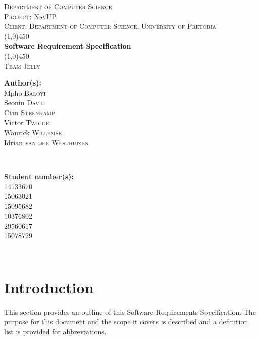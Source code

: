 \documentclass[a4paper,12pt]{article}
\begin{document}
\begin{titlepage}
\center


\textsc{\LARGE Department of Computer Science} \\ [.5cm]
\textsc{\Large Project: NavUP} \\ [.5cm]
\textsc{\Large Client: Department of Computer Science, University of Pretoria} \\ [.5cm]
\line(1,0){450}\\[.5cm]
\huge{\bfseries Software Requirement Specification}\\
\line(1,0){450}\\[.5cm]
\textsc{\LARGE Team Jelly}\\ [0.5cm]

\begin{minipage}{0.4\textwidth}
\begin{flushleft} \large
\textbf{Author(s):}\\
Mpho \textsc{Baloyi}\\
Seonin  \textsc{David}\\
Cian  \textsc{Steenkamp}\\
Victor \textsc{Twigge}\\
Wanrick  \textsc{Willemse}\\
Idrian  \textsc{van der Westhuizen}\\
\end{flushleft}
\end{minipage}
~
\begin{minipage}{0.4\textwidth}
\begin{flushright} \large
\textbf{Student number(s):} \\
14133670\\
15063021\\
15095682\\
10376802\\
29560617\\
15078729\\
\end{flushright}
\end{minipage}\\


\vfil

\end{titlepage}
\newpage
\tableofcontents
\newpage

\newpage
\section{Introduction}
This section provides an outline of this Software Requirements Specification. The purpose for this document and the scope it covers is described and a definition list is provided for abbreviations.
\end{document}
